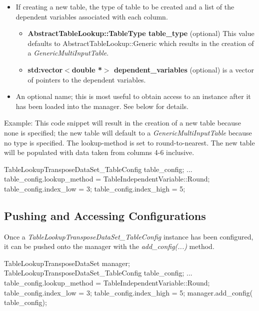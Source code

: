 \documentclass[11pt,fleqn]{report}
\begin{document}
\begin{itemize}
       \begin{itemize}
        \item \textbf{GenericMultiInputTable * table\_ptr} (optional)
       \end{itemize}
 \item If creating a new table, the type of table to be created and
       a list of the dependent variables associated with each column.
       \begin{itemize}
        \item \textbf{AbstractTableLookup::TableType table\_type} (optional)
              This value defaults to AbstractTableLookup::Generic which results
              in the creation of a \textit{GenericMultiInputTable}.
        \item \textbf{std:vector$<$double *$>$ dependent\_variables} (optional)
              is a vector of pointers to the dependent variables.
       \end{itemize}
 \item An optional name; this is most useful to obtain access to an instance
       after it has been loaded into the manager.  See below for details.
\end{itemize}


Example:
This code snippet will result in the creation of a new table because none is
specified; the new table will default to a \textit{GenericMultiInputTable}
because no type is specified.  The lookup-method is set to round-to-nearest.
The new table will be populated with data taken from columns 4-6 inclusive.
\begin{code}
TableLookupTransposeDataSet_TableConfig table_config;
...
table_config.lookup_method = TableIndependentVariable::Round;
table_config.index_low = 3;
table_config.index_high = 5;
\end{code}

\subsection{ Pushing and Accessing Configurations}
Once a \textit{TableLookupTransposeDataSet\_TableConfig}  instance has been
configured, it can be pushed onto the manager with the
\textit{add\_config(...)} method.
\begin{code}
TableLookupTransposeDataSet             manager;
TableLookupTransposeDataSet_TableConfig table_config;
...
table_config.lookup_method = TableIndependentVariable::Round;
table_config.index_low = 3;
table_config.index_high = 5;
manager.add_config( table_config);
\end{code}
\end{document}
